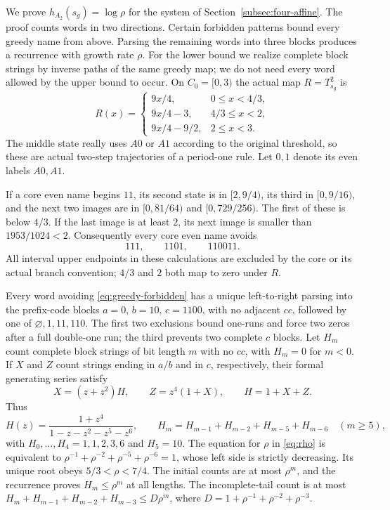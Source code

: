 \documentclass[11pt,reqno]{amsart}
\numberwithin{equation}{section}
\theoremstyle{definition}
\theoremstyle{definition}
\begin{document}
We prove $h_{A_2}(s_g)=\log\rho$ for the system of
Section~\ref{subsec:four-affine}. The proof counts words in two
directions. Certain forbidden patterns bound every greedy name from
above. Parsing the remaining words into three blocks produces a
recurrence with growth rate $\rho$. For the lower bound we realize
complete block strings by inverse paths of the same greedy map;
we do not need every word allowed by the upper bound to occur.
On $C_0=[0,3)$ the actual map $R=T_{s_g}^2$ is
\begin{equation}\label{eq:greedy-R}
 R(x)=\begin{cases}
 9x/4,&0\le x<4/3,\\
 9x/4-3,&4/3\le x<2,\\
 9x/4-9/2,&2\le x<3.
 \end{cases}
\end{equation}
The middle state really uses $A0$ or $A1$ according to the original
threshold, so these are actual two-step trajectories of a period-one
rule. Let $0,1$ denote its even labels $A0,A1$.

If a core even name begins $11$, its second state is in
$[2,9/4)$, its third in $[0,9/16)$, and the next two images
are in $[0,81/64)$ and $[0,729/256)$. The first of these
is below $4/3$. If the last image is at least $2$, its next
image is smaller than $1953/1024<2$.
Consequently every core even name avoids
\begin{equation}\label{eq:greedy-forbidden}
 111,\qquad1101,\qquad110011.
\end{equation}
All interval upper endpoints in these calculations are excluded by
the core or its actual branch convention; $4/3$ and $2$ both
map to zero under $R$.

Every word avoiding \eqref{eq:greedy-forbidden} has a unique
left-to-right parsing into the prefix-code blocks
$a=0$, $b=10$, $c=1100$, with no adjacent $cc$, followed by
one of $\varnothing,1,11,110$. The first two exclusions bound
one-runs and force two zeros after a full double-one run; the third
prevents two complete $c$ blocks. Let $H_m$ count complete block
strings of bit length $m$ with no $cc$, with $H_m=0$ for
$m<0$. If $X$ and $Z$ count strings ending in $a/b$ and in
$c$, respectively, their formal generating series satisfy
\[
 X=(z+z^2)H,\qquad Z=z^4(1+X),\qquad H=1+X+Z.
\]
Thus
\begin{equation}\label{eq:greedy-H}
 H(z)=\frac{1+z^4}{1-z-z^2-z^5-z^6},\qquad
 H_m=H_{m-1}+H_{m-2}+H_{m-5}+H_{m-6}\quad(m\ge5),
\end{equation}
with $H_0,\ldots,H_4=1,1,2,3,6$ and $H_5=10$.
The equation for $\rho$ in \eqref{eq:rho} is equivalent to
$\rho^{-1}+\rho^{-2}+\rho^{-5}+\rho^{-6}=1$, whose left side
is strictly decreasing. Its unique root obeys $5/3<\rho<7/4$.
The initial counts are at most $\rho^m$, and the recurrence
proves $H_m\le\rho^m$ at all lengths. The incomplete-tail
count is at most
$H_m+H_{m-1}+H_{m-2}+H_{m-3}\le D\rho^m$, where
$D=1+\rho^{-1}+\rho^{-2}+\rho^{-3}$.
\end{document}
